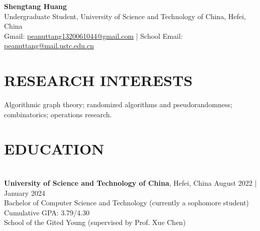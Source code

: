 \documentclass[a4paper,9pt]{extarticle}
\begin{document}
\pagestyle{fancy}
\renewcommand{\headrulewidth}{0pt}
\fancyhead{}
\fancyhead[R]{\textit{\today}}
\thispagestyle{empty} %

\begin{flushleft}
\textbf{\LARGE Shengtang Huang}\\[2pt] %
Undergraduate Student, University of Science and Technology of China, Hefei, China
\\ Gmail: \href{mailto:peanuttang1320061044@gmail.com}{peanuttang1320061044@gmail.com} | School Email: \href{mailto:peanuttang@mail.ustc.edu.cn}{peanuttang@mail.ustc.edu.cn} %
\end{flushleft}

\section*{RESEARCH INTERESTS}
\noindent
Algorithmic graph theory; randomized algorithms and pseudorandomness; combinatorics; operations research.
\section*{EDUCATION}

\noindent\\
\textbf{University of Science and Technology of China},  Hefei, China \hfill August 2022 | January 2024\\ %
Bachelor of Computer Science and Technology (currently a sophomore student) \hfill Cumulative GPA: 3.79/4.30 \\
School of the Gited Young (supervised by Prof. Xue Chen)

\end{document}
